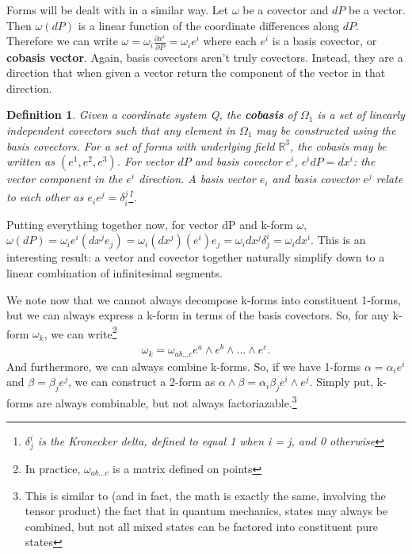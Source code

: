 \documentclass{book}
\newtheorem{defn}[equation]{Definition}
\begin{document}
Forms will be dealt with in a similar way. Let $\omega$ be a covector and $dP$ be a vector. Then $\omega(dP)$ is a linear function of the coordinate differences along $dP$. Therefore we can write $\omega = \omega_i \frac{\partial x^i}{\partial P} = \omega_i e^i$ where each $e^i$ is a basis covector, or \textbf{cobasis vector}. Again, basis covectors aren't truly covectors. Instead, they are a direction that when given a vector return the component of the vector in that direction. 

\begin{defn}
	Given a coordinate system Q, the \textbf{cobasis} of $\Omega_1$ is a set of linearly independent covectors such that any element in $\Omega_1$ may be constructed using the basis covectors. For a set of forms with underlying field $\mathbb{R}^3$, the cobasis may be written as $(e^1, e^2, e^3)$. For vector $dP$ and basis covector $e^i$, $e^i dP = dx^i$: the vector component in the $e^i$ direction. A basis vector $e_i$ and basis covector $e^j$ relate to each other as $e_ie^j = \delta^j_i$\footnote{$\delta^i_j$ is the Kronecker delta, defined to equal 1 when i = j, and 0 otherwise}. 
\end{defn}
 

Putting everything together now, for vector dP and k-form $\omega$, $\omega(dP) = \omega_ie^i(dx^je_j) = \omega_i(dx^j)(e^i)e_j = \omega_idx^j\delta^i_j = \omega_i dx^i$. This is an interesting result: a vector and covector together naturally simplify down to a linear combination of infinitesimal segments. 

We note now that we cannot always decompose k-forms into constituent 1-forms, but we can always express a k-form in terms of the basis covectors. So, for any k-form $\omega_k$, we can write\footnote{In practice, $\omega_{ab...c}$ is a matrix defined on points} \begin{gather} \omega_k = \omega_{ab...c}e^a\wedge e^b \wedge ... \wedge e^c. \end{gather} And furthermore, we can always combine k-forms. So, if we have 1-forms $\alpha = \alpha_i e^i$ and $\beta = \beta_j e^j$, we can construct a 2-form as $\alpha\wedge\beta = \alpha_i\beta_j e^i\wedge e^j$. Simply put, k-forms are always combinable, but not always factoriazable.\footnote{This is similar to (and in fact, the math is exactly the same, involving the tensor product) the fact that in quantum mechanics, states may always be combined, but not all mixed states can be factored into constituent pure states}
\end{document}
